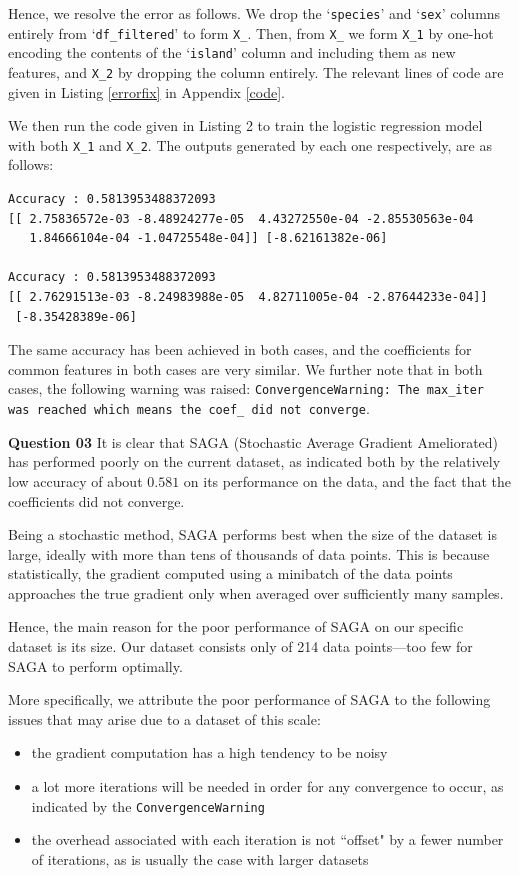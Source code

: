 \documentclass{article}[a4paper]
\begin{document}
	Hence, we resolve the error as follows. We drop the `\texttt{species}' and `\texttt{sex}' columns entirely from `\texttt{df\_filtered}' to form \texttt{X\_}. Then, from \texttt{X\_} we form \texttt{X\_1} by one-hot encoding the contents of the `\texttt{island}' column and including them as new features, and \texttt{X\_2} by dropping the column entirely. The relevant lines of code are given in Listing \ref{errorfix} in Appendix \ref{code}.

	We then run the code given in Listing 2 to train the logistic regression model with both \texttt{X\_1} and \texttt{X\_2}. The outputs generated by each one respectively, are as follows:
	\begin{verbatim}
Accuracy : 0.5813953488372093
[[ 2.75836572e-03 -8.48924277e-05  4.43272550e-04 -2.85530563e-04
   1.84666104e-04 -1.04725548e-04]] [-8.62161382e-06]

Accuracy : 0.5813953488372093
[[ 2.76291513e-03 -8.24983988e-05  4.82711005e-04 -2.87644233e-04]]
 [-8.35428389e-06]
\end{verbatim}
	The same accuracy has been achieved in both cases, and the coefficients for common features in both cases are very similar. We further note that in both cases, the following warning was raised: \texttt{ConvergenceWarning: The max\_iter was reached which means the coef\_ did not converge}.\medskip

	\textbf{Question 03} It is clear that SAGA (Stochastic Average Gradient Ameliorated) has performed poorly on the current dataset, as indicated both by the relatively low accuracy of about $0.581$ on its performance on the data, and the fact that the coefficients did not converge.

	Being a stochastic method, SAGA performs best when the size of the dataset is large, ideally with more than tens of thousands of data points. This is because statistically, the gradient computed using a minibatch of the data points approaches the true gradient only when averaged over sufficiently many samples.

	Hence, the main reason for the poor performance of SAGA on our specific dataset is its size. Our dataset consists only of 214 data points---too few for SAGA to perform optimally.
	
	More specifically, we attribute the poor performance of SAGA to the following issues that may arise due to a dataset of this scale:
	\begin{itemize}[noitemsep]
		\item the gradient computation has a high tendency to be noisy
		\item a lot more iterations will be needed in order for any convergence to occur, as indicated by the \texttt{ConvergenceWarning}\item the overhead associated with each iteration is not ``offset" by a fewer number of iterations, as is usually the case with larger datasets
	\end{itemize}
\end{document}
